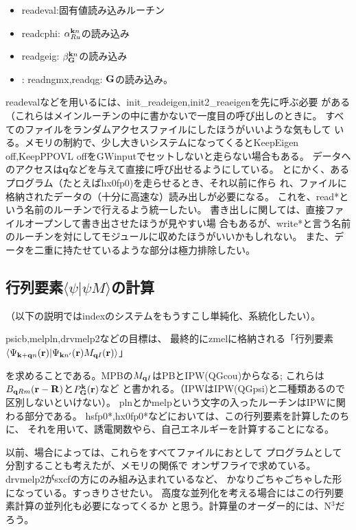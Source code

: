 \documentclass[a4paper,10pt,aip,onecolumn,amsmath,amssymb,floatfix,rmp]{revtex4-1}
\newcommand{\bfq}{{\bf q}}
\newcommand{\bfk}{{\bf k}}
\newcommand{\bfr}{{\bf r}}
\newcommand{\bfR}{{\bf R}}
\def\Psikqn{{\Psi_{{\bf k}+{\bf q} n}}}
\begin{document}
\begin{itemize}
\item 
readeval:固有値読み込みルーチン
\item
readcphi: $\alpha^{{\bfk}n}_{Ru}$の読み込み
\item
readgeig: $\beta^{{\bfk}n}_{\bf G}$の読み込み
\item:
readngmx,readqg: ${\bf G}$の読み込み。
\end{itemize}
readevalなどを用いるには、init\_readeigen,init2\_reaeigenを先に呼ぶ必要
がある（これらはメインルーチンの中に書かないで一度目の呼び出しのときに。
すべてのファイルをランダムアクセスファイルにしたほうがいいような気もして
いる。メモリの制約で、少し大きいシステムになってくるとKeepEigen
off,KeepPPOVL offをGWinputでセットしないと走らない場合もある。
データへのアクセスは{\bf q}などを与えて直接に呼び出せるようにしている。
とにかく、あるプログラム（たとえばhx0fp0)を走らせるとき、それ以前に作ら
れ、ファイルに格納されたデータの（十分に高速な）読み出しが必要になる。
これを、read*という名前のルーチンで行えるよう統一したい。
書き出しに関しては、直接ファイルオープンして書き出させたほうが見やすい場
合もあるが、write*と言う名前のルーチンを対にしてモジュールに収めたほうがいいかもしれない。
また、データを二重に持たせているような部分は極力排除したい。


\subsection{行列要素$\langle \psi |\psi M \rangle$の計算}
（以下の説明ではindexのシステムをもうすこし単純化、系統化したい）。

psicb,melpln,drvmelp2などの目標は、
最終的にzmelに格納される「行列要素$\langle\Psikqn(\bfr)|\Psi_{\bfk n'}(\bfr) M_{{\bf q}I}(\bfr)\rangle$」

を求めることである。MPBの$M_{{\bf q}I}$はPBとIPW(QGcou)からなる;
これらは$B_{\bfq Rm}(\bfr-\bfR)$と$P^{\bf k}_{\bf G}({\bf r})$など
と書かれる。（IPWはIPW(QGpsi)と二種類あるので区別しないといけない）。
plnとかmelpという文字の入ったルーチンはIPWに関わる部分である。
hsfp0*,hx0fp0*などにおいては、この行列要素を計算したのちに、
それを用いて、誘電関数やら、自己エネルギーを計算することになる。

以前、場合によっては、これらをすべてファイルにおとして
プログラムとして分割することも考えたが、メモリの関係で
オンザフライで求めている。drvmelp2がsxcfの方にのみ組み込まれているなど、
かなりごちゃごちゃした形になっている。すっきりさせたい。
高度な並列化を考える場合にはこの行列要素計算の並列化も必要になってくるか
と思う。計算量のオーダー的には、N$^3$だろう。\\
\end{document}
